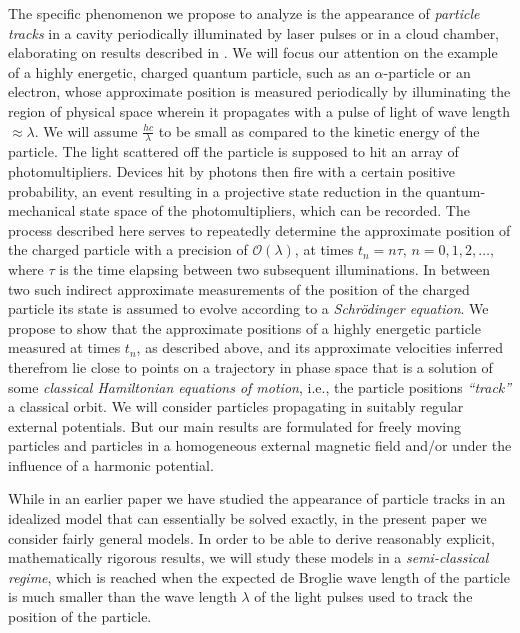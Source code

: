 \documentclass[12pt]{article}
\begin{document}
The specific phenomenon we propose to analyze is the appearance of \textit{particle tracks} in a cavity periodically illuminated by 
laser pulses or in a cloud chamber, elaborating on results described in \cite{BBFF}. 
We will focus our attention on the example of a highly energetic, charged quantum particle, such as an $\alpha$-particle 
or an electron, whose approximate position is measured periodically by illuminating the region of physical space wherein
it propagates with a pulse of light of wave length $\approx\lambda$. We will assume $\frac{hc}{\lambda}$ to be small as 
compared to the kinetic energy of the particle. The light scattered off the particle is supposed to hit an array of 
photomultipliers. Devices hit by photons then fire with a certain positive probability, an event resulting in a projective state 
reduction in the quantum-mechanical state space of the photomultipliers, which can be recorded. The process described 
here serves to repeatedly determine the approximate position of the charged particle with a precision of $\mathcal{O}(\lambda)$, 
at times $t_n= n\tau,\, n=0,1,2, \dots,$ where $\tau$ is the time elapsing between two subsequent illuminations. 
In between two such indirect approximate measurements of the position of the charged particle
its state is assumed to evolve according to a \textit{Schr\"odinger equation}. 
We propose to show that the approximate positions of a highly energetic particle measured 
at times $t_n$, as described above, and its approximate velocities inferred therefrom lie close to points on a trajectory 
in phase space that is a solution of some \textit{classical Hamiltonian equations of motion}, i.e., the particle positions 
\textit{``track''} a classical orbit. We will consider particles propagating in suitably regular external potentials. But
our main results are formulated for freely moving particles and particles in a homogeneous external 
magnetic field and/or under the influence of a harmonic potential. 

While in an earlier paper \cite{BBFF} we have studied the appearance of particle tracks in an idealized model 
that can essentially be solved exactly, in the present paper we consider fairly general models. In order to be able 
to derive reasonably explicit, mathematically rigorous results, we will study these models in a 
\textit{semi-classical regime}, which is reached when the expected de Broglie wave length of the 
particle is much smaller than the wave length $\lambda$ of the light pulses used to track the position 
of the particle. 
\end{document}
